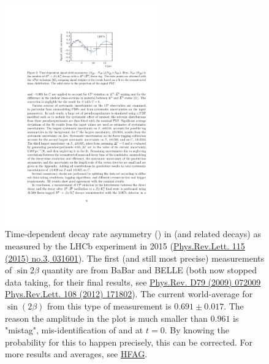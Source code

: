  \begin{figure}
 \centering
 \includegraphics[width=0.6\textwidth]{fig/LHCb_B2JpsiKsAsy}
 \caption{Time-dependent decay rate asymmetry () in  (and related decays) as measured by the LHCb experiment in 2015 (\href{http://inspirehep.net/record/1355375/}{Phys.Rev.Lett. 115 (2015) no.3, 031601}). 
 The first (and still most precise) measurements of $\sin2\beta$ quantity are from BaBar
 and BELLE (both now stopped data taking, for their final results, see \href{https://inspirehep.net/record/812984?ln=en}{Phys.Rev. D79 (2009) 072009} \href{https://inspirehep.net/record/1085529?ln=en}{Phys.Rev.Lett. 108 (2012) 171802}). 
 The current world-average for $\sin(2\beta)$ from this type of measurement is $0.691 \pm 0.017$.
 The reason the amplitude in the plot is much smaller than $0.961$ is "mistag", mis-identification of  and  at $t=0$. By knowing the probability for this to happen precisely, this can be corrected.
 For more results and averages, see \href{http://www.slac.stanford.edu/xorg/hfag/triangle/summer2016/index.shtml\#sin2b}{HFAG}.\label{fig:tddra}}
 \end{figure}
